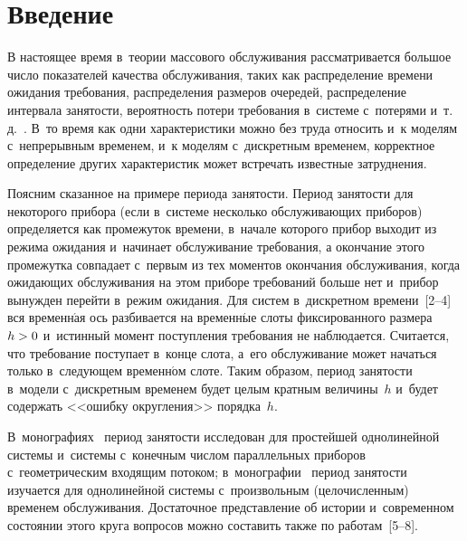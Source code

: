   



\thispagestyle{headings}

\begin{multicols}{2}

\label{st\stat}


\section{Введение}

В настоящее время в~теории массового обслуживания рассматривается большое число
показателей качества обслуживания, таких как распределение времени ожидания
требования, распределения размеров очередей, распределение интервала занятости,
вероятность потери требования в~системе с~потерями и~т.\,д.~\cite{Ivchenko:Kashtanov:Kovalenko}. В~то время как одни характеристики
можно без труда относить и~к моделям с~непрерывным временем, и~к моделям с~дискретным временем, корректное определение других характеристик может встречать
известные затруднения. 

Поясним сказанное на примере периода занятости. Период
за\-ня\-тости для некоторого прибора (если в~системе несколько обслуживающих
приборов) определяется как промежуток времени, в~начале которого прибор выходит
из режима ожидания и~начинает обслуживание требования, а окончание этого
промежутка совпадает с~первым из тех моментов окончания обслуживания, когда
ожидающих обслуживания на этом приборе требований больше нет и~прибор вынужден
перейти в~режим ожидания. Для систем в~дискретном времени~[2--4] вся временн$\acute{\mbox{а}}$я
ось разбивается на временн$\acute{\mbox{ы}}$е слоты фиксированного размера $h\hm>0$ и~истинный
момент поступления требования не наблюдается. Считается, что требование
поступает в~конце слота, а~его обслуживание может начаться только в~сле\-ду\-ющем
временн$\acute{\mbox{о}}$м слоте. Таким образом, период за\-ня\-тости в~модели с~дискретным временем
будет целым кратным величины~$h$ и~будет содержать <<ошибку округления>> порядка~$h$.  

В~монографиях~\cite{Alfa, Bruneel:Kim} период занятости исследован для
прос\-тей\-шей однолинейной сис\-те\-мы и~сис\-те\-мы с~конечным чис\-лом параллельных
приборов с~гео\-мет\-ри\-че\-ским входящим потоком; в~монографии~\cite{Pechinkin:Razumchik} 
период за\-ня\-тости изуча\-ет\-ся для однолинейной системы с~произвольным (це\-ло\-чис\-лен\-ным) временем обслуживания. Достаточное пред\-став\-ле\-ние об
истории и~современном со\-сто\-янии этого круга вопросов мож\-но со\-ста\-вить также по
работам~[5--8].



\end{multicols}
